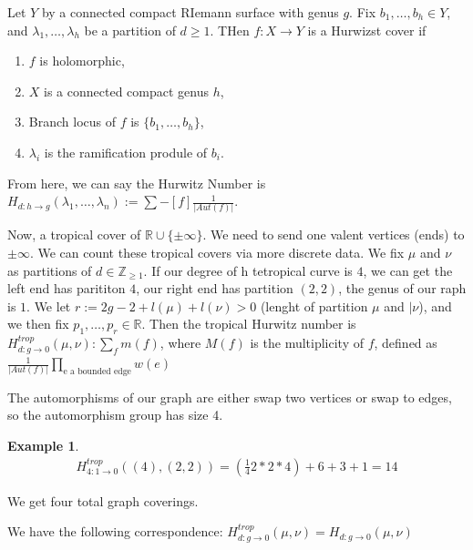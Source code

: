 \documentclass[12pt]{memoir}
\theoremstyle{definition}
\newtheorem{protoexample}{Example}[section]
\newenvironment{ex}
   {\begin{protoexample}}
   {\end{protoexample}}
\def\ZZ{{\mathbb Z}}
\def\RR{{\mathbb R}}
\begin{document}
Let $Y$ by a connected compact RIemann surface with genus $g$. Fix $b_1, \dots, b_h \in Y$, and $\lambda_1, \dots, \lambda_h$ be a partition of $d \geq 1$. THen $f:X \rightarrow Y$ is a Hurwizst cover if 

\begin{enumerate}
    \item $f$ is holomorphic, 
    \item $X$ is a connected compact genus $h$,
    \item Branch locus of $f$ is $\{b_1, \dots, b_h\}$,
    \item $\lambda_i$ is the ramification produle of $b_i$.
\end{enumerate}



From here, we can say the Hurwitz Number is $H_{d:h \rightarrow g}(\lambda_1, \dots, \lambda_n):= \sum\limits-{[f]} \frac{1}{|Aut(f)|}$.



Now, a tropical cover of $\RR \cup \{\pm\infty\}$. We need to send one valent vertices (ends) to $\pm \infty$. We can count these tropical covers via more discrete data. We fix $\mu$ and $\nu$ as partitions of $d \in \ZZ_{\geq 1}$. If our degree of h tetropical curve is $4$, we can get the left end has parititon $4$, our right end has partition $(2,2)$, the genus of our raph is $1$. We let $r:=2g-2+l(\mu) + l(\nu) >0$ (lenght of partition $\mu$ and $|\nu$), and we then fix $p_1, \dots, p_r \in \RR$. Then the tropical Hurwitz number is $H^{trop}_{d: g \rightarrow 0}(\mu,\nu): \sum\limits_{f} m(f)$, where $M(f)$ is the multiplicity of $f$, defined as $\frac{1}{|Aut(f)|}\prod_{\text{e a bounded edge}}w(e)$


The automorphisms of our graph are either swap two vertices or swap to edges, so the automorphism group has size 4.

\begin{ex}
    \begin{align*}
        H^{trop}_{4:1\rightarrow 0} ((4),(2,2))=\left( \frac{1}{4} 2*2*4\right) +6+3+1 =14
    \end{align*}
    
\end{ex}

We get four total graph coverings.



We have the following correspondence: $H^{trop}_{d: g \rightarrow 0}(\mu,\nu)=H_{d: g \rightarrow 0}(\mu,\nu)$
\end{document}
